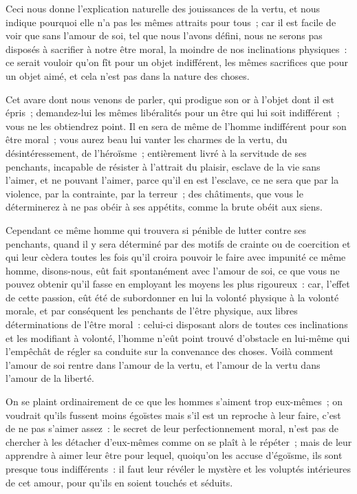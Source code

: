 \documentclass[french,twoside]{book} %
\begin{document}
Ceci nous donne l’explication naturelle des jouissances de la vertu, et nous indique pourquoi elle n’a pas les mêmes attraits pour tous ; car il est facile de voir que sans l’amour de soi, tel que nous l’avons défini, nous ne serons pas disposés à sacrifier à notre être moral, la moindre de nos inclinations physiques : ce serait vouloir qu’on fît pour un objet indifférent, les mêmes sacrifices que pour un objet aimé, et cela n’est pas dans la nature des choses.\par
Cet avare dont nous venons de parler, qui prodigue son or à l’objet dont il est épris ; demandez-lui les mêmes libéralités pour un être qui lui soit indifférent ; vous ne les obtiendrez point. Il en sera de même de l’homme indifférent pour son être moral ; vous aurez beau lui vanter les charmes de la vertu, du désintéressement, de l’héroïsme ; entièrement livré à la servitude de ses penchants, incapable de résister à l’attrait du plaisir, esclave de la vie sans l’aimer, et ne pouvant l’aimer, parce qu’il en est l’esclave, ce ne sera que par la violence, par la contrainte, par la terreur ; des châtiments, que vous le déterminerez à ne pas obéir à ses appétits, comme la brute obéit aux siens.\par
Cependant ce même homme qui trouvera si pénible de lutter contre ses penchants, quand il y sera déterminé par des motifs de crainte ou de coercition et qui leur cèdera toutes les fois qu’il croira pouvoir le faire avec impunité ce même homme, disons-nous, eût fait spontanément avec l’amour de soi, ce que vous ne pouvez obtenir qu’il fasse en employant les moyens les plus rigoureux : car, l’effet de cette passion, eût été de subordonner en lui la volonté physique à la volonté morale, et par conséquent les penchants de l’être physique, aux libres déterminations de l’être moral : celui-ci disposant alors de toutes ces inclinations et les modifiant à volonté, l’homme n’eût point trouvé d’obstacle en lui-même qui l’empêchât de régler sa conduite sur la convenance des choses. Voilà comment l’amour de soi rentre dans l’amour de la vertu, et l’amour de la vertu dans l’amour de la liberté.\par
On se plaint ordinairement de ce que les hommes s’aiment trop eux-mêmes ; on voudrait qu’ils fussent moins égoïstes mais s’il est un reproche à leur faire, c’est de ne pas s’aimer assez : le secret de leur perfectionnement moral, n’est pas de chercher à les détacher d’eux-mêmes comme on se plaît à le répéter ; mais de leur apprendre à aimer leur être pour lequel, quoiqu’on les accuse d’égoïsme, ils sont presque tous indifférents : il faut leur révéler le mystère et les voluptés intérieures de cet amour, pour qu’ils en soient touchés et séduits.\par
\end{document}
